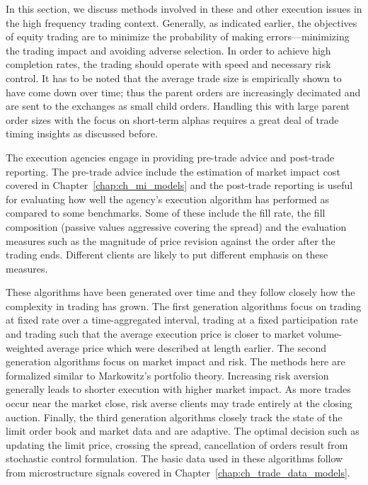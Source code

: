 In this section, we discuss methods involved in these and other execution issues in the high frequency trading context. Generally, as indicated earlier, the objectives of equity trading are to minimize the probability of making errors---minimizing the trading impact and avoiding adverse selection. In order to achieve high completion rates, the trading should operate with speed and necessary risk control. It has to be noted that the average trade size is empirically shown to have come down over time; thus the parent orders are increasingly decimated and are sent to the exchanges as small child orders. Handling this with large parent order sizes with the focus on short-term alphas requires a great deal of trade timing insights as discussed before.


The execution agencies engage in providing pre-trade advice and post-trade reporting. The pre-trade advice include the estimation of market impact cost covered in Chapter~\ref{chap:ch_mi_models} and the post-trade reporting is useful for evaluating how well the agency's execution algorithm has performed as compared to some benchmarks. Some of these include the fill rate, the fill composition (passive values aggressive covering the spread) and the evaluation measures such as the magnitude of price revision against the order after the trading ends. Different clients are likely to put different emphasis on these measures. 


These algorithms have been generated over time and they follow closely how the complexity in trading has grown. The first generation algorithms focus on trading at fixed rate over a time-aggregated interval, trading at a fixed participation rate and trading such that the average execution price is closer to market volume-weighted average price which were described at length earlier. The second generation algorithms focus on market impact and risk. The methods here are formalized similar to Markowitz's portfolio theory. Increasing risk aversion generally leads to shorter execution with higher market impact. As more trades occur near the market close, risk averse clients may trade entirely at the closing auction. Finally, the third generation algorithms closely track the state of the limit order book and market data and are adaptive. The optimal decision such as updating the limit price, crossing the spread, cancellation of orders result from stochastic control formulation. The basic data used in these algorithms follow from microstructure signals covered in Chapter~\ref{chap:ch_trade_data_models}. 



